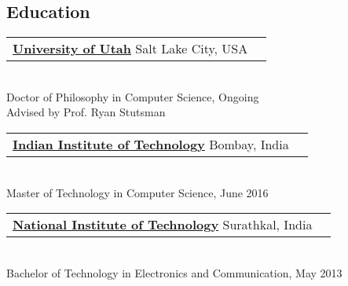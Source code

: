 \documentclass[margin,line]{res}
\begin{document}
\begin{resume}


\section{\sc Education}
 \begin{tabular}{@{}p{5.5in}p{4in}}
  {\bf \href{http://www.cs.utah.edu/}{University of Utah}} \dotfill Salt Lake City,
  USA
 \end{tabular}
 \\ {\small Doctor of Philosophy in Computer Science, Ongoing}
 \\ {\small Advised by Prof. Ryan Stutsman}

 \vspace{-2.5pt}
 \begin{tabular}{@{}p{5.5in}p{4in}}
  {\bf \href{http://www.cse.iitb.ac.in/}{Indian Institute of
  Technology}} \dotfill Bombay, India
 \end{tabular}
 \\ {\small Master of Technology in Computer Science, June 2016}

 \vspace{-2.5pt}
 \begin{tabular}{@{}p{5.5in}p{4in}}
  {\bf \href{http://www.ece.nitk.ac.in/}{National Institute of
  Technology}} \dotfill Surathkal, India
 \end{tabular}
 \\ {\small Bachelor of Technology in Electronics and Communication, May 2013}


\end{resume}
\end{document}
